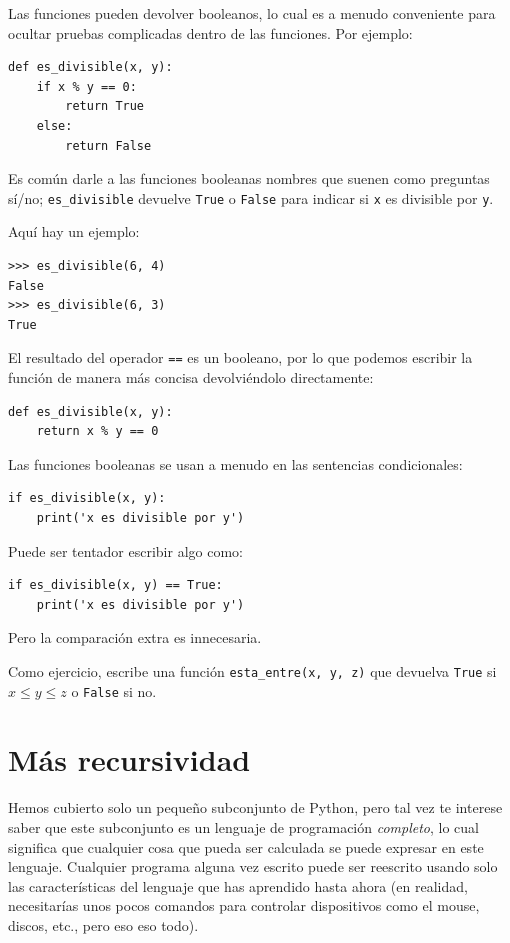 \documentclass[10pt]{book}
\begin{document}
Las funciones pueden devolver booleanos, lo cual es a menudo conveniente para ocultar
pruebas complicadas dentro de las funciones.  
Por ejemplo:

\begin{verbatim}
def es_divisible(x, y):
    if x % y == 0:
        return True
    else:
        return False
\end{verbatim}
%
Es común darle a las funciones booleanas nombres que suenen como preguntas
sí/no; \verb"es_divisible" devuelve {\tt True} o {\tt False}
para indicar si {\tt x} es divisible por {\tt y}.

Aquí hay un ejemplo:

\begin{verbatim}
>>> es_divisible(6, 4)
False
>>> es_divisible(6, 3)
True
\end{verbatim}
%
El resultado del operador {\tt ==} es un booleano, por lo que podemos escribir la
función de manera más concisa devolviéndolo directamente:

\begin{verbatim}
def es_divisible(x, y):
    return x % y == 0
\end{verbatim}
%
Las funciones booleanas se usan a menudo en las sentencias condicionales:

\begin{verbatim}
if es_divisible(x, y):
    print('x es divisible por y')
\end{verbatim}
%
Puede ser tentador escribir algo como:

\begin{verbatim}
if es_divisible(x, y) == True:
    print('x es divisible por y')
\end{verbatim}
%
Pero la comparación extra es innecesaria.

Como ejercicio, escribe una función \verb"esta_entre(x, y, z)" que
devuelva {\tt True} si $x \le y \le z$ o {\tt False} si no.


\section{Más recursividad}
\label{more.recursion}

Hemos cubierto solo un pequeño subconjunto de Python, pero tal vez
te interese saber que este subconjunto es un lenguaje de programación {\em completo},
lo cual significa que cualquier cosa que pueda ser
calculada se puede expresar en este lenguaje.  Cualquier programa alguna vez escrito
puede ser reescrito usando solo las características del lenguaje que has aprendido
hasta ahora (en realidad, necesitarías unos pocos comandos para controlar dispositivos
como el mouse, discos, etc., pero eso eso todo).
\end{document}
